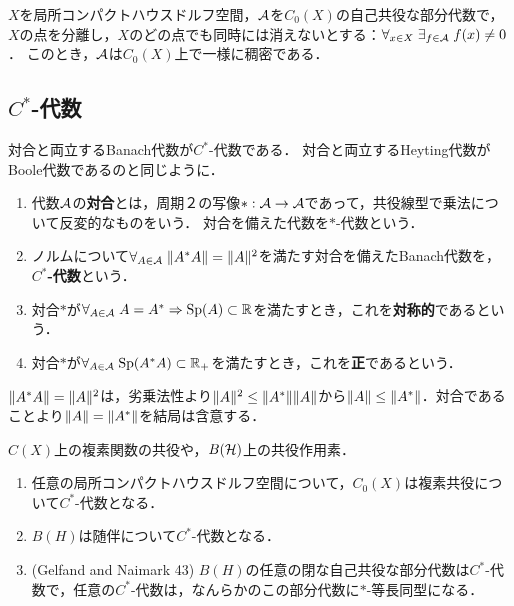 \documentclass[uplatex,dvipdfmx]{jsreport}
\begin{document}
\begin{corollary}
    $X$を局所コンパクトハウスドルフ空間，$\mathcal{A}$を$C_0(X)$の自己共役な部分代数で，$X$の点を分離し，$X$のどの点でも同時には消えないとする：$\forall_{x\in X}\;\exists_{f\in\mathcal{A}}\;f(x)\ne0$．
    このとき，$\mathcal{A}$は$C_0(X)$上で一様に稠密である．
\end{corollary}

\subsection{$C^*$-代数}

\begin{tcolorbox}[colframe=ForestGreen, colback=ForestGreen!10!white,breakable,colbacktitle=ForestGreen!40!white,coltitle=black,fonttitle=\bfseries\sffamily,
title=]
    対合と両立するBanach代数が$C^*$-代数である．
    対合と両立するHeyting代数がBoole代数であるのと同じように．
\end{tcolorbox}

\begin{definition}\mbox{}
    \begin{enumerate}
        \item 代数$\mathcal{A}$の\textbf{対合}とは，周期２の写像$*:\mathcal{A}\to\mathcal{A}$であって，共役線型で乗法について反変的なものをいう．
        対合を備えた代数を$*$-代数という．
        \item ノルムについて$\forall_{A\in\mathcal{A}}\;\|A^*A\|=\|A\|^2$を満たす対合を備えたBanach代数を，\textbf{$C^*$-代数}という．
        \item 対合$*$が$\forall_{A\in\mathcal{A}}\;A=A^*\Rightarrow\mathrm{Sp}(A)\subset\mathbb{R}$を満たすとき，これを\textbf{対称的}であるという．
        \item 対合$*$が$\forall_{A\in\mathcal{A}}\;\mathrm{Sp}(A^*A)\subset\mathbb{R}_+$を満たすとき，これを\textbf{正}であるという．
    \end{enumerate}
\end{definition}
\begin{remarks}
    $\|A^*A\|=\|A\|^2$は，劣乗法性より$\|A\|^2\le\|A^*\|\|A\|$から$\|A\|\le\|A^*\|$．対合であることより$\|A\|=\|A^*\|$を結局は含意する．
\end{remarks}
\begin{example}[involution]
    $C(X)$上の複素関数の共役や，$B(\mathcal{H})$上の共役作用素．
\end{example}
\begin{example}\mbox{}
    \begin{enumerate}
        \item 任意の局所コンパクトハウスドルフ空間について，$C_0(X)$は複素共役について$C^*$-代数となる．
        \item $B(H)$は随伴について$C^*$-代数となる．
        \item (Gelfand and Naimark 43) $B(H)$の任意の閉な自己共役な部分代数は$C^*$-代数で，任意の$C^*$-代数は，なんらかのこの部分代数に$*$-等長同型になる．
    \end{enumerate}
\end{example}
\end{document}
